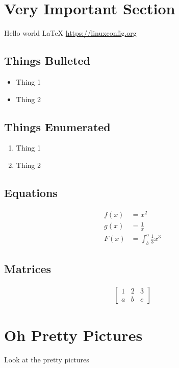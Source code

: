 \documentclass{article}
\begin{document}
\maketitle
\newpage
\tableofcontents
{}
\newpage
\listoffigures
\listoftables
\newpage
{}

\section{Very Important Section}
Hello world \LaTeX
\url{https://linuxconfig.org}

\subsection{Things Bulleted}
\begin{itemize}
	\item Thing 1
	\item Thing 2
\end{itemize}

\subsection{Things Enumerated}
\begin{enumerate}
	\item Thing 1
	\item Thing 2
\end{enumerate}

\subsection{Equations}
\begin{align*}
  f(x) &= x^2\\
  g(x) &= \frac{1}{x}\\
  F(x) &= \int^a_b \frac{1}{3}x^3
\end{align*}

\subsection{Matrices}
\begin{align*}
\begin{bmatrix}
	1 & 2 & 3\\
	a & b & c
\end{bmatrix}
\end{align*}

\section{Oh Pretty Pictures}
Look at the pretty pictures
\end{document}
